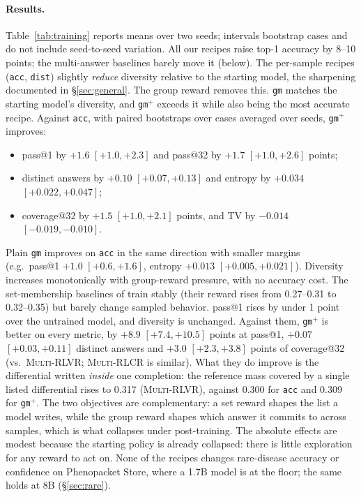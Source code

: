 \documentclass[11pt]{article}
\begin{document}
\paragraph{Results.}
Table~\ref{tab:training} reports means over two seeds; intervals bootstrap cases and do not include seed-to-seed variation. All our recipes raise top-1 accuracy by 8--10 points; the multi-answer baselines barely move it (below).
The per-sample recipes (\texttt{acc}, \texttt{dist}) slightly \emph{reduce} diversity relative to the starting model, the sharpening documented in \S\ref{sec:general}.
The group reward removes this. \texttt{gm} matches the starting model's diversity, and \texttt{gm}$^{+}$ exceeds it while also being the most accurate recipe.
Against \texttt{acc}, with paired bootstraps over cases averaged over seeds, \texttt{gm}$^{+}$ improves:
\begin{itemize}
\item pass@1 by $+1.6$ $[+1.0,+2.3]$ and pass@32 by $+1.7$ $[+1.0,+2.6]$ points;
\item distinct answers by $+0.10$ $[+0.07,+0.13]$ and entropy by $+0.034$ $[+0.022,+0.047]$;
\item coverage@32 by $+1.5$ $[+1.0,+2.1]$ points, and TV by $-0.014$ $[-0.019,-0.010]$.
\end{itemize}
Plain \texttt{gm} improves on \texttt{acc} in the same direction with smaller margins (e.g.\ pass@1 $+1.0$ $[+0.6,+1.6]$, entropy $+0.013$ $[+0.005,+0.021]$).
Diversity increases monotonically with group-reward pressure, with no accuracy cost.
The set-membership baselines of \citet{puri2026beyondmode} train stably (their reward rises from 0.27--0.31 to 0.32--0.35) but barely change sampled behavior. pass@1 rises by under 1 point over the untrained model, and diversity is unchanged. Against them, \texttt{gm}$^{+}$ is better on every metric, by $+8.9$ $[+7.4,+10.5]$ points at pass@1, $+0.07$ $[+0.03,+0.11]$ distinct answers and $+3.0$ $[+2.3,+3.8]$ points of coverage@32 (vs.\ \textsc{Multi-RLVR}; \textsc{Multi-RLCR} is similar).
What they do improve is the differential written \emph{inside} one completion: the reference mass covered by a single listed differential rises to 0.317 (\textsc{Multi-RLVR}), against 0.300 for \texttt{acc} and 0.309 for \texttt{gm}$^{+}$.
The two objectives are complementary: a set reward shapes the list a model writes, while the group reward shapes which answer it commits to across samples, which is what collapses under post-training.
The absolute effects are modest because the starting policy is already collapsed: there is little exploration for any reward to act on.
None of the recipes changes rare-disease accuracy or confidence on Phenopacket Store, where a 1.7B model is at the floor; the same holds at 8B (\S\ref{sec:rare}).
\end{document}
